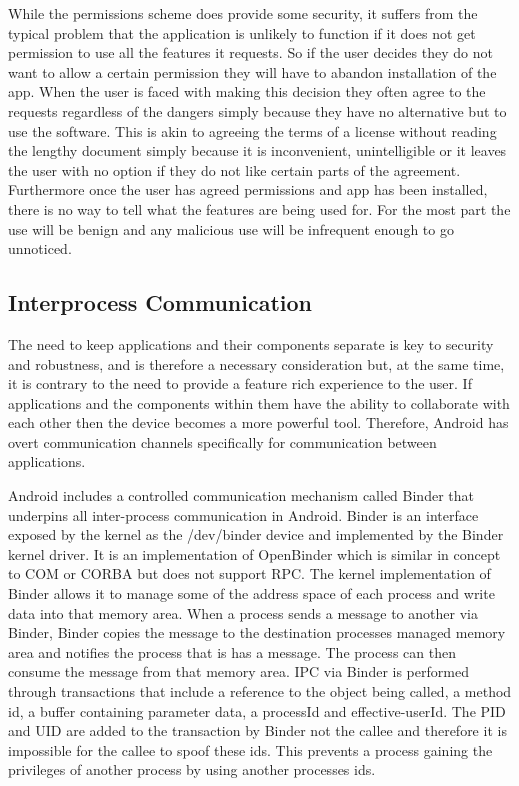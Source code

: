 While the permissions scheme does provide some security, it suffers from the typical problem that the application is unlikely to function if it does not get permission to use all the features it requests.  So if the user decides they do not want to allow a certain permission they will have to abandon installation of the app.  When the user is faced with making this decision they often agree to the requests regardless of the dangers simply because they have no alternative but to use the software.  This is akin to agreeing the terms of a license without reading the lengthy document simply because it is inconvenient, unintelligible or it leaves the user with no option if they do not like certain parts of the agreement.  Furthermore once the user has agreed permissions and app has been installed, there is no way to tell what the features are being used for.  For the most part the use will be benign and any malicious use will be infrequent enough to go unnoticed.
 
\subsection{Interprocess Communication}
\label{sec:IPC}

The need to keep applications and their components separate is key to security and robustness, and is therefore a necessary consideration but, at the same time, it is contrary to the need to provide a feature rich experience to the user.  If applications and the components within them have the ability to collaborate with each other then the device becomes a more powerful tool.  Therefore, Android has overt communication channels specifically for communication between applications.

Android includes a controlled communication mechanism called Binder that underpins all inter-process communication in Android.  Binder is an interface exposed by the kernel as the /dev/binder device and implemented by the Binder kernel driver.  It is an implementation of OpenBinder which is similar in concept to COM or CORBA but does not support RPC.  The kernel implementation of Binder allows it to manage some of the address space of each process and write data into that memory area.  When a process sends a message to another via Binder, Binder copies the message to the destination processes managed memory area and notifies the process that is has a message.  The process can then consume the message from that memory area.  IPC via Binder is performed through transactions that include a reference to the object being called, a method id, a buffer containing parameter data, a processId and effective-userId.  The PID and UID are added to the transaction by Binder not the callee and therefore it is impossible for the callee to spoof these ids.  This prevents a process gaining the privileges of another process by using another processes ids.

